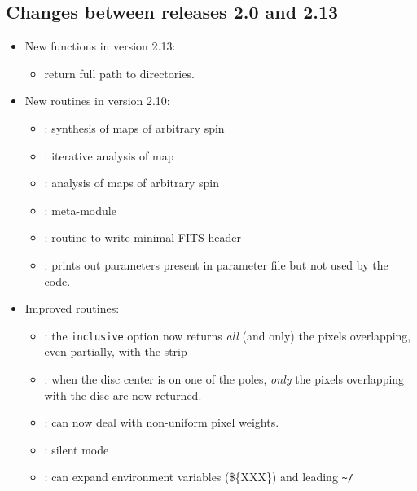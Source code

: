 \documentclass[12pt,twoside]{article}
\begin{document}
{\subsection[Changes between releases 2.0 and 2.13]{Changes between releases 2.0 and 2.13}
\begin{itemize}
\item New functions in version 2.13: 
\begin{itemize}
	\item{} return full path to \healpix directories.
\end{itemize}
\item New routines in version 2.10: 
\begin{itemize}
	\item{}: synthesis of maps of
arbitrary spin
	\item{}: iterative analysis of map
	\item{}: analysis of maps of
arbitrary spin
	\item{}: meta-module
	\item{}: routine
to write minimal FITS header
	\item{}: prints out
parameters present in parameter file but not used by the code.
\end{itemize}
\item Improved routines:
\begin{itemize}
\item {}: the {\tt inclusive} option now
returns {\em all} (and only) the pixels overlapping, even partially, with the
strip
\item {}: when the disc center is on one of
the poles, {\em only} the pixels overlapping with the disc are now returned.
\item {}: can now deal with non-uniform
pixel weights.
\item {}: silent mode
\item {}: can expand environment variables
(\$\{XXX\}) and leading \verb+~+$\!${\tt /}
\end{itemize}


\end{itemize}}
\end{document}
